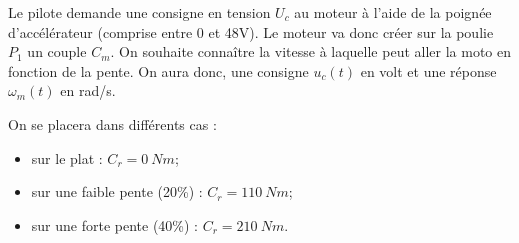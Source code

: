 \documentclass[10pt,fleqn]{article} %
\begin{document}
\begin{multicols}{2}
%
%
%
%
%
%
%
%

Le pilote demande une consigne en tension $U_c$ au moteur à l’aide de la poignée d’accélérateur (comprise entre 0 et 48V). Le moteur va donc créer sur la poulie $P_1$ un couple $C_m$. On souhaite connaître la vitesse à laquelle peut aller la moto en fonction de la pente. On aura donc, une consigne $u_c(t)$ en volt et une réponse $\omega_m (t)$ en rad/s.

On se placera dans différents cas :
\begin{itemize}
\item sur le plat : $C_r=\SI{0}{Nm}$;
\item sur une faible pente (20\%) : $C_r = \SI{110}{Nm}$;
\item sur une forte pente (40\%) : $C_r = \SI{210}{Nm}$.
\end{itemize}


\end{multicols}
\end{document}
